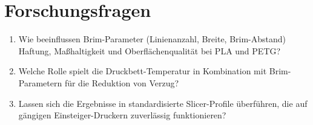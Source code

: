 \chapter{Forschungsfragen}
\label{cha:Forschungsfragen}

\begin{enumerate}
\item Wie beeinflussen Brim-Parameter (Linienanzahl, Breite, Brim-Abstand) Haftung, Maßhaltigkeit und Oberflächenqualität bei PLA und PETG?
\item Welche Rolle spielt die Druckbett-Temperatur in Kombination mit Brim-Parametern für die Reduktion von Verzug?
\item Lassen sich die Ergebnisse in standardisierte Slicer-Profile überführen, die auf gängigen Einsteiger-Druckern zuverlässig funktionieren?
\end{enumerate}